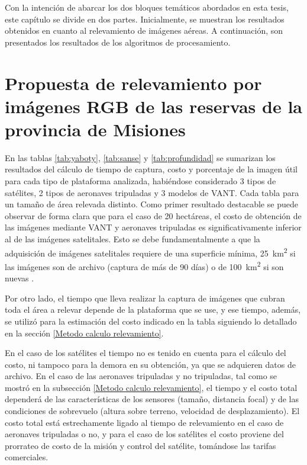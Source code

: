 

\color{black} 
Con la intención de abarcar los dos bloques temáticos abordados en esta tesis, este capítulo se divide en dos partes. Inicialmente, se muestran los resultados obtenidos en cuanto al relevamiento de imágenes aéreas. A continuación, son presentados los resultados de los algoritmos de procesamiento.
\section {Propuesta de relevamiento por imágenes RGB de las reservas de la provincia de Misiones} \label{resultados bloque 1}


En las tablas \ref{tab:yaboty}, \ref{tab:sanse} y \ref{tab:profundidad} se sumarizan los resultados del cálculo de tiempo de captura, costo y porcentaje de la imagen útil para cada tipo de plataforma analizada, habiéndose considerado 3 tipos de satélites, 2 tipos de aeronaves tripuladas y 3 modelos de VANT. Cada tabla para un tamaño de área relevada distinto. Como primer resultado destacable se puede observar de forma clara que para el caso de 20 hectáreas, el costo de obtención de las imágenes mediante VANT y aeronaves tripuladas es significativamente inferior al de las imágenes satelitales. Esto se debe fundamentalmente a que la adquisición de imágenes satelitales requiere de una superficie mínima, \SI{25}{\kilo\metre\squared} si las imágenes son de archivo (captura de más de 90 días) o de \SI{100}{\kilo\metre\squared} si son nuevas \cite{noauthor_satellite_2020}.

Por otro lado, el tiempo que lleva realizar la captura de imágenes que cubran toda el área a relevar depende de la plataforma que se use, y ese tiempo, además, se utilizó para la estimación del costo indicado en la tabla siguiendo lo detallado en la sección \ref{Metodo calculo relevamiento}. 

En el caso de los satélites el tiempo no es tenido en cuenta para el cálculo del costo, ni tampoco para la demora en su obtención, ya que se adquieren datos de archivo. En el caso de las aeronaves tripuladas y no tripuladas, tal como se mostró en la subsección \ref{Metodo calculo relevamiento}, el tiempo y el costo total dependerá de las características de los sensores (tamaño, distancia focal) y de las condiciones de sobrevuelo (altura sobre terreno, velocidad de desplazamiento). El costo total está estrechamente ligado al tiempo de relevamiento en el caso de aeronaves tripuladas o no, y para el caso de los satélites el costo proviene del prorrateo de costo de la misión y control del satélite, tomándose las tarifas comerciales.

